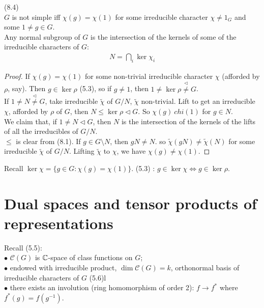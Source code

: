 \documentclass[a4paper]{article}
\begin{document}
\begin{lemma} (8.4)\\
$G$ is not simple iff $\chi(g) = \chi(1)$ for some irreducible character $\chi \neq 1_G$ and some $1 \neq g \in G$.\\
Any normal subgroup of $G$ is the intersection of the kernels of some of the irreducible characters of $G$:
\begin{equation*}
\begin{aligned}
N =\bigcap_i \ker \chi_i
\end{aligned}
\end{equation*}
\begin{proof}
If $\chi(g) = \chi(1)$ for some non-trivial irreducible character $\chi$ (afforded by $\rho$, say). Then $g \in \ker\rho$ (5.3), so if $g \neq 1$, then $1 \neq \ker \rho \stackrel{\triangleleft}{\neq} G$.\\
If $1 \neq N \stackrel{\triangleleft}{\neq} G$, take irreducible $\tilde{\chi}$ of $G/N$, $\tilde{\chi}$ non-trivial. Lift to get an irreducible $\chi$, afforded by $\rho$ of $G$, then $N \leq \ker \rho \triangleleft G$. So $\chi(g) \ chi(1)$ for $g \in N$.\\
We claim that, if $1 \neq N \triangleleft G$, then $N$ is the intersection of the kernels of the lifts of all the irreducibles of $G/N$.\\
$\leq$ is clear from (8.1). If $g \in G \setminus N$, then $gN \neq N$. so $\tilde{\chi} (gN) \neq \tilde{\chi}(N)$ for some irreducible $\tilde{\chi}$ of $G/N$. Lifting $\tilde{\chi}$ to $\chi$, we have $\chi(g) \neq \chi(1)$.
\end{proof}
\end{lemma}
Recall $\ker \chi = \{g \in G: \chi(g) = \chi(1)\}$. (5.3) : $g \in \ker\chi \iff g \in \ker\rho$.

\newpage
\section{Dual spaces and tensor products of representations}

Recall (5.5):\\
$\bullet$ $\mathcal{C}(G)$ is $\mathbb{C}$-space of class functions on $G$;\\
$\bullet$ endowed with irreducible product, $\dim \mathcal{C}(G) = k$, orthonormal basis of irreducible characters of $G$ (5.6)l\\
$\bullet$ there exists an involution (ring homomorphism of order 2): $f \to f^*$ where $f^*(g) = f(g^{-1})$.
\end{document}
